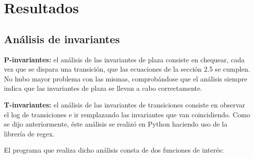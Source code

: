 \documentclass{article}
\begin{document}
    \section{Resultados}
    \subsection{Análisis de invariantes}
    \textbf{P-invariantes: } el análisis de las invariantes de plaza consiste en chequear, 
    cada vez que se dispara una transición, que las ecuaciones de la sección 2.5 se cumplen.
    No hubo mayor problema con las mismas, comprobándose que el análisis siempre indica que
    las invariantes de plaza se llevan a cabo correctamente. \newline \par
    \textbf{T-invariantes: } el análisis de las invariantes de transiciones consiste en 
    observar el log de transiciones e ir remplazando las invariantes que van coincidiendo.
    Como se dijo anteriormente, éste análisis se realizó en Python haciendo uso de la 
    librería de regex. \par
    El programa que realiza dicho análisis consta de dos funciones de interés: \par
\end{document}
